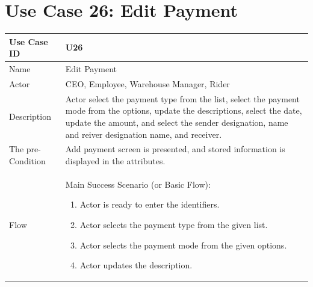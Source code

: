 \documentclass[12pt,a4paper]{report}
\begin{document}
\section{Use Case 26: Edit Payment}
\begin{tabular}{ | m{3cm} | m{12cm}| } \hline
Use Case ID & U26   \\\hline
Name  &  Edit Payment \\ \hline
Actor &   CEO, Employee, Warehouse Manager, Rider \\ \hline
Description & Actor select the payment type from the list, select the payment mode from the options, update the descriptions, select the date, update the amount, and select the sender designation, name and reiver designation name, and receiver. \\ \hline
The pre-Condition & Add payment screen is presented, and stored information is displayed in the attributes. \\\hline
Flow & Main Success Scenario (or Basic Flow):
\begin{enumerate}
\item Actor is ready to enter the identifiers.
\item Actor selects the payment type from the given list.   
\item Actor selects the payment mode from the given options.
\item Actor updates the description.
\end{enumerate}\\ \hline
\end{tabular}
\end{document}
